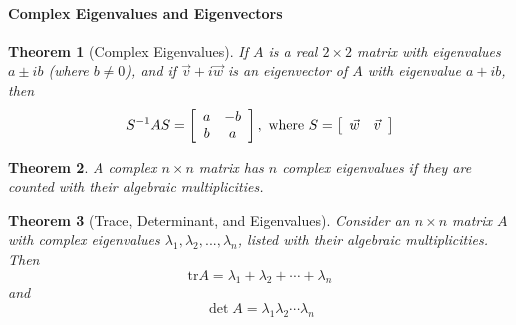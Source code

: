 \documentclass[10pt]{report}
\newtheorem{thm2}{Theorem}[section]
\begin{document}
\paragraph{Complex Eigenvalues and Eigenvectors}


\begin{thm2}[Complex Eigenvalues]
If $A$ is a real $2\times 2$ matrix with eigenvalues $a\pm ib$ (where $b\neq0$), and if $\vec{v}+i\vec{w}$ is an eigenvector of $A$ with eigenvalue $a+ib$, then
$$S^{-1}AS = \left[ \begin{array}{c c}
a & -b\\
b & a
\end{array}\right], \text{  where  } S = \left[ \begin{array}{c c}
\vec{w} & \vec{v}\\
\end{array}\right]$$
\end{thm2}
\begin{thm2}
A complex $n\times n$ matrix has $n$ complex eigenvalues if they are counted with their algebraic multiplicities.
\end{thm2}
\begin{thm2}[Trace, Determinant, and Eigenvalues]
Consider an $n\times n$ matrix $A$ with complex eigenvalues $\lambda_1, \lambda_2, ..., \lambda_n$, listed with their algebraic multiplicities. Then
$$\text{tr}A=\lambda_1 + \lambda_2 + \cdots + \lambda_n$$
and
$$\det A=\lambda_1\lambda_2\cdots \lambda_n$$
\end{thm2}
\end{document}
